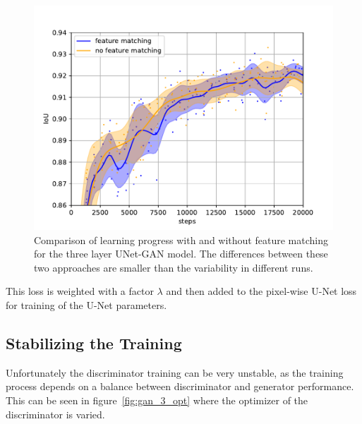 \documentclass[aps,prl,twocolumn,groupedaddress,amsmath,amssymb]{revtex4-1}
\begin{document}
     \begin{figure}[tbp]
        \begin{center}
        \includegraphics[width=\linewidth]{figures/gan_3_no_fm.pdf}
        \end{center}
        \caption{Comparison of learning progress with and without feature matching for the three
        layer UNet-GAN model. The differences between these two approaches are smaller than the 
        variability in different runs.}
        \label{fig:gan_fm}
    \end{figure}

    This loss is weighted with a factor $\lambda$ and then added to the pixel-wise U-Net loss for 
    training of the U-Net parameters.

    \subsection{Stabilizing the Training}

    Unfortunately the discriminator training can be very unstable, as the training process
    depends on a balance between discriminator and generator performance. This can be seen in 
    figure~\ref{fig:gan_3_opt} where the optimizer of the discriminator is varied.
\end{document}
